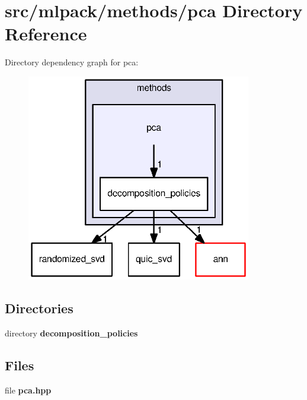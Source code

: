 \section{src/mlpack/methods/pca Directory Reference}
\label{dir_473b7c10a53e85be883d242699eb1a8c}
Directory dependency graph for pca\+:
\nopagebreak
\begin{figure}[H]
\begin{center}
\leavevmode
\includegraphics[width=278pt]{dir_473b7c10a53e85be883d242699eb1a8c_dep}
\end{center}
\end{figure}
\subsection*{Directories}
\begin{DoxyCompactItemize}
\item 
directory {\bf decomposition\+\_\+policies}
\end{DoxyCompactItemize}
\subsection*{Files}
\begin{DoxyCompactItemize}
\item 
file {\bf pca.\+hpp}
\end{DoxyCompactItemize}
